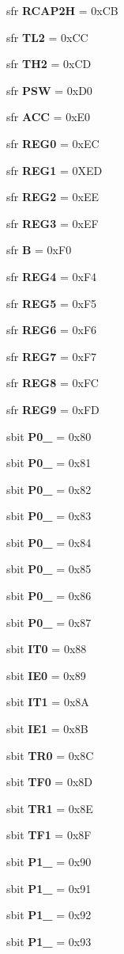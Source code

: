 \begin{DoxyCompactItemize}
sfr {\bf R\+C\+A\+P2H} = 0x\+CB
\item 
sfr {\bf T\+L2} = 0x\+CC
\item 
sfr {\bf T\+H2} = 0x\+CD
\item 
sfr {\bf P\+SW} = 0x\+D0
\item 
sfr {\bf A\+CC} = 0x\+E0
\item 
sfr {\bf R\+E\+G0} = 0x\+EC
\item 
sfr {\bf R\+E\+G1} = 0\+X\+ED
\item 
sfr {\bf R\+E\+G2} = 0x\+EE
\item 
sfr {\bf R\+E\+G3} = 0x\+EF
\item 
sfr {\bf B} = 0x\+F0
\item 
sfr {\bf R\+E\+G4} = 0x\+F4
\item 
sfr {\bf R\+E\+G5} = 0x\+F5
\item 
sfr {\bf R\+E\+G6} = 0x\+F6
\item 
sfr {\bf R\+E\+G7} = 0x\+F7
\item 
sfr {\bf R\+E\+G8} = 0x\+FC
\item 
sfr {\bf R\+E\+G9} = 0x\+FD
\item 
sbit {\bf P0\+\_} = 0x80
\item 
sbit {\bf P0\+\_} = 0x81
\item 
sbit {\bf P0\+\_} = 0x82
\item 
sbit {\bf P0\+\_} = 0x83
\item 
sbit {\bf P0\+\_} = 0x84
\item 
sbit {\bf P0\+\_} = 0x85
\item 
sbit {\bf P0\+\_} = 0x86
\item 
sbit {\bf P0\+\_} = 0x87
\item 
sbit {\bf I\+T0} = 0x88
\item 
sbit {\bf I\+E0} = 0x89
\item 
sbit {\bf I\+T1} = 0x8A
\item 
sbit {\bf I\+E1} = 0x8B
\item 
sbit {\bf T\+R0} = 0x8C
\item 
sbit {\bf T\+F0} = 0x8D
\item 
sbit {\bf T\+R1} = 0x8E
\item 
sbit {\bf T\+F1} = 0x8F
\item 
sbit {\bf P1\+\_} = 0x90
\item 
sbit {\bf P1\+\_} = 0x91
\item 
sbit {\bf P1\+\_} = 0x92
\item 
sbit {\bf P1\+\_} = 0x93

\end{DoxyCompactItemize}
